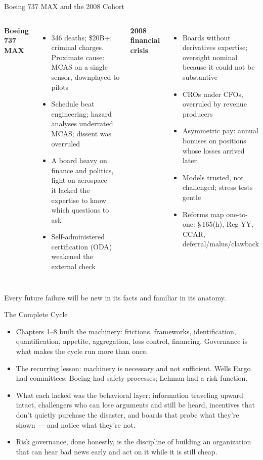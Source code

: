 \documentclass[11pt, aspectratio=169]{beamer}
\begin{document}
\begin{frame}{Boeing 737 MAX and the 2008 Cohort}
\begin{columns}[T]
\textbf{Boeing 737 MAX}
\begin{itemize}
  \item 346 deaths; \$20B+; criminal charges. Proximate cause: MCAS on a single sensor, downplayed to pilots
  \item Schedule beat engineering; hazard analyses underrated MCAS; dissent was overruled
  \item A board heavy on finance and politics, light on aerospace --- it \alert{lacked the expertise to know which questions to ask}
  \item Self-administered certification (ODA) weakened the external check
\end{itemize}
\textbf{2008 financial crisis}
\begin{itemize}
  \item Boards without derivatives expertise; oversight nominal because it could not be substantive
  \item CROs under CFOs, overruled by revenue producers
  \item Asymmetric pay: annual bonuses on positions whose losses arrived later
  \item Models trusted, not challenged; stress tests gentle
  \item Reforms map one-to-one: \S\,165(h), Reg YY, CCAR, deferral/malus/clawback
\end{itemize}
\end{columns}
\medskip
Every future failure will be new in its facts and familiar in its anatomy.
\end{frame}

\begin{frame}{The Complete Cycle}
\begin{itemize}
  \item Chapters 1--8 built the machinery: frictions, frameworks, identification, quantification, appetite, aggregation, loss control, financing. \alert{Governance is what makes the cycle run more than once.}
  \item The recurring lesson: machinery is necessary and not sufficient. Wells Fargo had committees; Boeing had safety processes; Lehman had a risk function.
  \item What each lacked was the behavioral layer: information traveling upward intact, challengers who can lose arguments and still be heard, incentives that don't quietly purchase the disaster, and boards that probe what they're shown --- and notice what they're not.
  \item Risk governance, done honestly, is the discipline of building an organization that can \alert{hear bad news early and act on it while it is still cheap}.
\end{itemize}
\end{frame}
\end{document}
